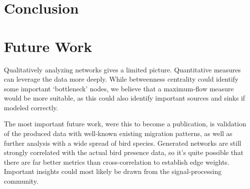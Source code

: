 \section{Conclusion}


\section{Future Work}
Qualitatively analyzing networks gives a limited picture. Quantitative measures can leverage the data more deeply. While betweenness centrality could identify some important `bottleneck' nodes, we believe that a maximum-flow measure would be more suitable, as this could also identify important sources and sinks if modeled correctly.

The most important future work, were this to become a publication, is validation of the produced data with well-known existing migration patterns, as well as further analysis with a wide spread of bird species. Generated networks are still strongly correlated with the actual bird presence data, so it's quite possible that there are far better metrics than cross-correlation to establish edge weights. Important insights could most likely be drawn from the signal-processing community. 